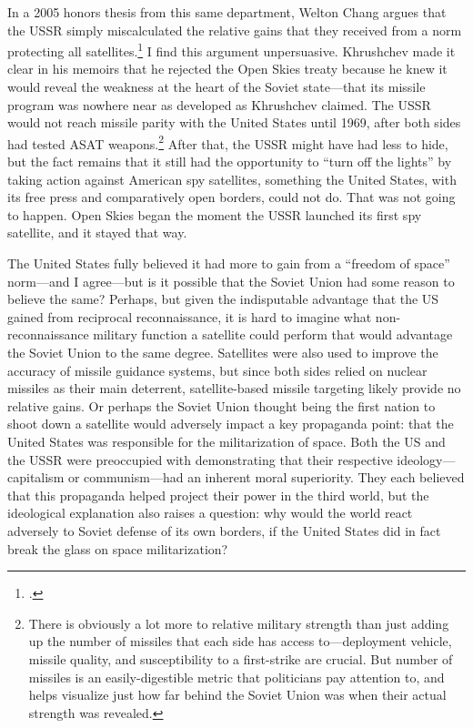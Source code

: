 \documentclass{memoir}
\begin{document}
In a 2005 honors thesis from this same department, Welton Chang argues that the USSR simply miscalculated the relative gains that they received from a norm protecting all satellites.\footcite[Welton Chang is now a senior associate at the Center for Strategic and International Studies, and received a Ph.D. in Psychology from the University of Pennsylvania, where he studied judgement and decisionmaking. Professor Valentino provided me with his honors work, and it has been invaluable in shaping my understanding of the politics of satellites and anti-satellite weapons.]{chang_all_2005} I find this argument unpersuasive. Khrushchev made it clear in his memoirs that he rejected the Open Skies treaty because he knew it would reveal the weakness at the heart of the Soviet state---that its missile program was nowhere near as developed as Khrushchev claimed. The USSR would not reach missile parity with the United States until 1969, after both sides had tested ASAT weapons.\footnote{There is obviously a lot more to relative military strength than just adding up the number of missiles that each side has access to---deployment vehicle, missile quality, and susceptibility to a first-strike are crucial. But number of missiles is an easily-digestible metric that politicians pay attention to, and helps visualize just how far behind the Soviet Union was when their actual strength was revealed.} After that, the USSR might have had less to hide, but the fact remains that it still had the opportunity to ``turn off the lights'' by taking action against American spy satellites, something the United States, with its free press and comparatively open borders, could not do. That was not going to happen. Open Skies began the moment the USSR launched its first spy satellite, and it stayed that way.

The United States fully believed it had more to gain from a ``freedom of space'' norm---and I agree---but is it possible that the Soviet Union had some reason to believe the same? Perhaps, but given the indisputable advantage that the US gained from reciprocal reconnaissance, it is hard to imagine what non-reconnaissance military function a satellite could perform that would advantage the Soviet Union to the same degree. Satellites were also used to improve the accuracy of missile guidance systems, but since both sides relied on nuclear missiles as their main deterrent, satellite-based missile targeting likely provide no relative gains. Or perhaps the Soviet Union thought being the first nation to shoot down a satellite would adversely impact a key propaganda point: that the United States was responsible for the militarization of space. Both the US and the USSR were preoccupied with demonstrating that their respective ideology---capitalism or communism---had an inherent moral superiority. They each believed that this propaganda helped project their power in the third world, but the ideological explanation also raises a question: why would the world react adversely to Soviet defense of its own borders, if the United States did in fact break the glass on space militarization?
\end{document}
